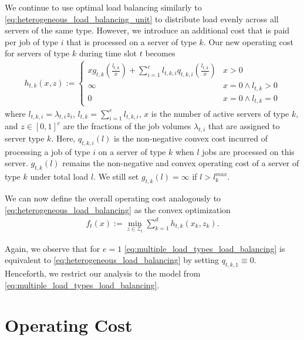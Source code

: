 We continue to use optimal load balancing similarly to \autoref{eq:heterogeneous_load_balancing_unit} to distribute load evenly across all servers of the same type. However, we introduce an additional cost that is paid per job of type $i$ that is processed on a server of type $k$. Our new operating cost for servers of type $k$ during time slot $t$ becomes \begin{align}\label{eq:multiple_load_types_load_balancing_unit}
    h_{t,k}(x,z) := \begin{cases} 
        x g_{t,k}\left(\frac{l_{t,k}}{x}\right) + \sum_{i=1}^e l_{t,k,i} q_{t,k,i}\left(\frac{l_{t,k}}{x}\right) & x > 0 \\
        \infty                                                                                                   & x = 0 \land l_{t,k} > 0 \\
        0                                                                                                        & x = 0 \land l_{t,k} = 0
    \end{cases}
\end{align} where $l_{t,k,i} = \lambda_{t,i} z_i$, $l_{t,k} = \sum_{i=1}^e l_{t,k,i}$, $x$ is the number of active servers of type $k$, and $z \in [0,1]^e$ are the fractions of the job volumes $\lambda_{t,i}$ that are assigned to server type $k$. Here, $q_{t,k,i}(l)$ is the non-negative convex cost incurred of processing a job of type $i$ on a server of type $k$ when $l$ jobs are processed on this server. $g_{t,k}(l)$ remains the non-negative and convex operating cost of a server of type $k$ under total load $l$. We still set $g_{t,k}(l) = \infty$ if $l > l_k^{max}$.

We can now define the overall operating cost analogously to \autoref{eq:heterogeneous_load_balancing} as the convex optimization \begin{align}\label{eq:multiple_load_types_load_balancing}
    f_t(x) := \min_{z \in \mathcal{Z}_t} \sum_{k=1}^d h_{t,k}(x_k,z_k).
\end{align}

Again, we observe that for $e = 1$ \autoref{eq:multiple_load_types_load_balancing} is equivalent to \autoref{eq:heterogeneous_load_balancing} by setting $q_{t,k,1} \equiv 0$. Henceforth, we restrict our analysis to the model from \autoref{eq:multiple_load_types_load_balancing}.

\section{Operating Cost}\label{section:application:operating_cost}


